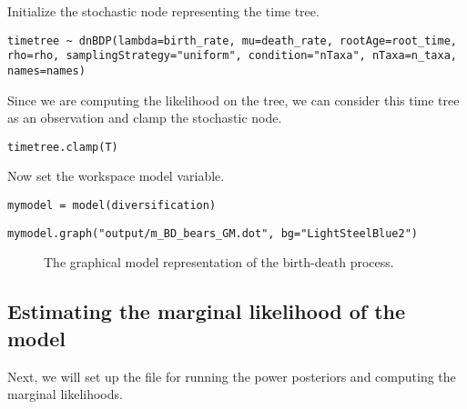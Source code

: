 Initialize the stochastic node representing the time tree.
{\tt \begin{snugshade*}
\begin{lstlisting}
timetree ~ dnBDP(lambda=birth_rate, mu=death_rate, rootAge=root_time, rho=rho, samplingStrategy="uniform", condition="nTaxa", nTaxa=n_taxa, names=names)
\end{lstlisting}
\end{snugshade*}}

Since we are computing the likelihood on the \citet{dosReis2012} tree, we can consider this time tree as an observation and clamp the stochastic node.
{\tt \begin{snugshade*}
\begin{lstlisting}
timetree.clamp(T)
\end{lstlisting}
\end{snugshade*}}

Now set the workspace model variable.
{\tt \begin{snugshade*}
\begin{lstlisting}
mymodel = model(diversification)
\end{lstlisting}
\end{snugshade*}}

{\tt \begin{snugshade*}
\begin{lstlisting}
mymodel.graph("output/m_BD_bears_GM.dot", bg="LightSteelBlue2")
\end{lstlisting}
\end{snugshade*}}

\begin{figure}[h!]
\centering
{}
\caption{\small The graphical model representation of the birth-death process.}
\label{BDGMGVfig}
\end{figure}



\subsection{Estimating the marginal likelihood of the model}

Next, we will set up the file for running the power posteriors and computing the marginal likelihoods.



